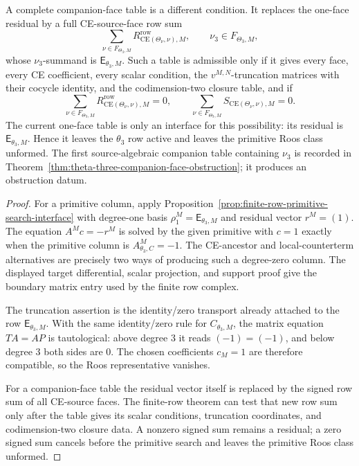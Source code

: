 \begin{prop}
  A complete companion-face table is a different condition.  It replaces
  the one-face residual by a full
  CE-source-face row sum
  \[
    \sum_{\nu\in F_{\Theta_3,M}}
      R^{\mathrm{row}}_{\mathrm{CE}(\Theta_\nu,\nu),M},
    \qquad
    \nu_3\in F_{\Theta_3,M},
  \]
  whose \(\nu_3\)-summand is \(\mathsf E_{\theta_3,M}\).  Such a table is
  admissible only if it gives every face, every CE coefficient, every
  scalar condition, the \(v^{M,N}\)-truncation matrices with their cocycle
  identity, and the codimension-two closure table, and if
  \[
    \sum_{\nu\in F_{\Theta_3,M}}
      R^{\mathrm{row}}_{\mathrm{CE}(\Theta_\nu,\nu),M}=0,
    \qquad
    \sum_{\nu\in F_{\Theta_3,M}}
      S_{\mathrm{CE}(\Theta_\nu,\nu),M}=0.
  \]
  The current one-face table is only an interface for this possibility: its
  residual is \(\mathsf E_{\theta_3,M}\).  Hence it leaves the
  \(\theta_3\) row active and leaves the primitive Roos class unformed.
  The first
  source-algebraic companion table containing \(\nu_3\) is recorded in
  Theorem~\ref{thm:theta-three-companion-face-obstruction}; it produces an
  obstruction datum.
\end{prop}

\begin{proof}
  For a primitive column, apply
  Proposition~\ref{prop:finite-row-primitive-search-interface} with
  degree-one basis \(\rho^M_1=\mathsf E_{\theta_3,M}\) and residual vector
  \(r^M=(1)\).  The equation \(A^M c=-r^M\) is solved by the given
  primitive with \(c=1\) exactly when the primitive column is
  \(A^M_{\theta_3,C}=-1\).  The CE-ancestor and local-counterterm
  alternatives are precisely two ways of producing such a degree-zero
  column.  The displayed target differential, scalar projection, and
  support proof give the boundary matrix entry used by the finite row
  complex.

  The truncation assertion is the identity/zero transport already attached
  to the row \(\mathsf E_{\theta_3,M}\).  With the same identity/zero rule
  for \(C_{\theta_3,M}\), the matrix equation \(T A=A P\) is tautological:
  above degree \(3\) it reads \((-1)=(-1)\), and below degree \(3\) both
  sides are \(0\).  The chosen coefficients \(c_M=1\) are therefore
  compatible, so the Roos representative vanishes.

  For a companion-face table the residual vector itself is replaced by
  the signed row sum of all CE-source
  faces.  The finite-row theorem can test that new row sum only after the
  table gives its scalar conditions, truncation coordinates, and
  codimension-two closure data.  A nonzero signed sum remains a
  residual; a zero signed sum cancels before the primitive search and
  leaves the primitive Roos class unformed.
\end{proof}

